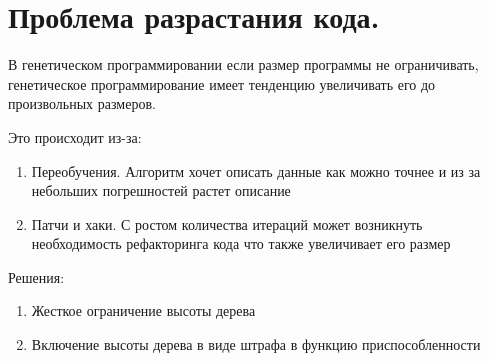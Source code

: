 \section{Проблема разрастания кода.}
В генетическом программировании если размер программы не ограничивать, генетическое программирование имеет тенденцию увеличивать его до произвольных размеров. 

Это происходит из-за:
\begin{enumerate} 
	\item Переобучения. Алгоритм хочет описать данные как можно точнее и из за небольших погрешностей растет описание 
	\item Патчи и хаки. С ростом количества итераций может возникнуть необходимость рефакторинга кода что также увеличивает его размер
\end{enumerate} 
Решения:
\begin{enumerate} 
	\item Жесткое ограничение высоты дерева
	\item Включение высоты дерева в виде штрафа в функцию приспособленности
\end{enumerate} 